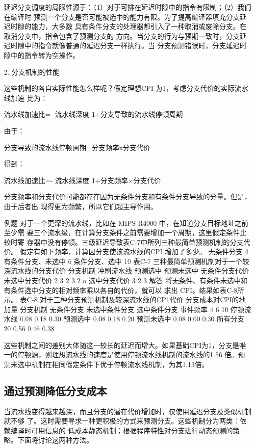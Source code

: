 延迟分支调度的局限性源于：（1）对于可排在延迟时隙中的指令有限制；（2）我们在编译时
预测一个分支是否可能被选中的能力有限。为了提高编译器填充分支延迟时隙的能力，大多数
具有条件分支的处理器都引入了一种取消或废除分支。在取消分支中，指令包含了预测分支的
方向。当分支的行为与预期一致时，分支延迟时隙中的指令就像普通的延迟分支一样执行。当
分支预测错误时，分支延迟时隙中的指令转为空操作。

2. 分支机制的性能

这些机制的各自实际性能怎么样呢？假定理想CPI 为1，考虑分支代价的实际流水线加速
比为：

流水线加速比=-
流水线深度
1+分支导致的流水线停顿周期

由于：

分支导致的流水线停顿周期=分支频率x分支代价

得到：

流水线加速比=-
流水线深度
1+分支频率×分支代价

分支频率和分支代价可能都存在因为无条件分支和有条件分支导致的分量。但是，由于后者出
现得更为频繁，所以它们起主导作用。

例题
对于一个更深的流水线，比如在 MIPS R4000 中，在知道分支目标地址之前至少需
要三个流水级，在计算分支条件之前需要增加一个周期，这里假定条件比较时寄
存器中没有停顿。三级延迟导致表C-7中所列三种最简单预测机制的分支代价。
假定有如下频率，计算因分支使该流水线的CPI 增加了多少。
无条件分支
4%
有条件分支、未选中
6%
条件分支、选中
10%
表C-7 三种最简单预测机制对于一个较深流水线的分支代价
分支机制
冲刷流水线
预测选中
预测未选中
无条件分支代价
未选中分支代价
2
3
2
3
2
o
选中分支代价
3
2
3
解答
将无条件、有条件未选中和有条件选中分支的相对频率乘以各自的代价，就可以
求出 CPI。结果如表C-8所示。
表C-8 对于三种分支预测机制及较深流水线的CP1代价
分支成本对CPI的地加量
分支机制
无条件分支
未选中条件分支
选中条件分支
事件频率
4%
6%
10%
停顿流水线
0.08
0.18
0.30
预测选中
0.08
0.18
0.20
预测未选中
0.08
0.00
0:30
所有分支
20%
0.56
0.46
0.38

这些机制之间的差别大体随这一较长的延迟而增大。如果基础CPI为1，分支是唯
一的停顿源，则理想流水线的速度是使用停顿流水线机制的流水线的1.56 倍。预
测未选中机制在相同假定条件下优于停顿流水线机制，为其1.13倍。

\subsection{通过预测降低分支成本}
当流水线变得越来越深，而且分支的潜在代价增加时，仅使用延迟分支及类似机制就不够
了。这时需要寻求一种更积极的方式来预测分支。这些机制分为两类：依赖编译时可用信息的
低成本静态机制；根据程序特性对分支进行动态预测的策略。下面将讨论这两种方法。

